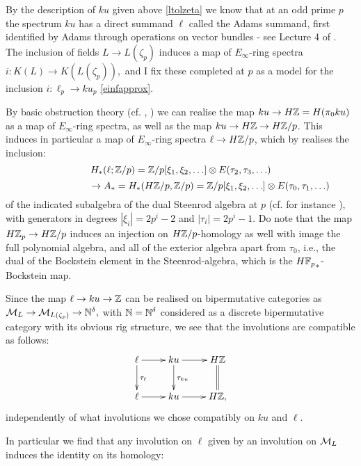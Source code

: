 By the description of $ku$ given above \ref{ltolzeta} we know that
at an odd prime $p$ the spectrum $ku$ has a direct summand $\ell$ 
called the Adams summand, first identified
by Adams through operations on vector bundles - see Lecture 4 of \cite{Ad69}. 
The inclusion of fields
$L\rightarrow L(\zeta_p)$ induces a map of $E_\infty$-ring spectra
$i\colon K(L)\rightarrow K(L(\zeta_p)),$ and I fix these completed at
$p$ as a model for the inclusion $i\colon \ell_p\rightarrow ku_p$ \ref{einfapprox}.

By basic obstruction theory (cf. \cite[Proposition 3.1]{EKMM},
\cite[p. 36, Lemma 2.12]{MayEinf})
we can realise the map $ku\rightarrow H\mathbb{Z} = H(\pi_0ku)$ 
as a map of $E_\infty$-ring spectra, as well as the map 
$ku\rightarrow H\mathbb{Z}\rightarrow H\mathbb{Z}/p$. This induces in particular
a map of $E_\infty$-ring spectra $\ell\rightarrow H\mathbb{Z}/p$, which by
\cite[Lemma 16.8]{Ad74} realises the inclusion:
\[H_*(\ell;\mathbb{Z}/p)=\mathbb{Z}/p[\xi_1,\xi_2,\ldots]\otimes E(\tau_2,\tau_3,\ldots)\]
\[\phantom{blubbelblubbel}\rightarrow A_*=H_*(H\mathbb{Z}/p,\mathbb{Z}/p) = 
\mathbb{Z}/p[\xi_1,\xi_2,\ldots]\otimes E(\tau_0,\tau_1,\ldots)\]
of the indicated subalgebra of the dual Steenrod algebra at $p$
(cf. for instance \cite[pp. 51-53]{Kochm}), with generators in degrees
$|\xi_i|=2p^i-2$ and $|\tau_i|=2p^i-1$. Do note that the map $H\mathbb{Z}_p\rightarrow
H\mathbb{Z}/p$ induces an injection on $H\mathbb{Z}/p$-homology as well 
with image the full polynomial algebra, and all of the
exterior algebra apart from $\tau_0$, i.e., the dual of the Bockstein
element in the Steenrod-algebra, which is the ${H\mathbb{F}_p}_*$-Bockstein
map.

Since the map $\ell\rightarrow ku\rightarrow \mathbb{Z}$ can be realised on
bipermutative categories as $\mathcal{M}_L\rightarrow \mathcal{M}_{L(\zeta_p)}\rightarrow 
\mathbb{N}^\delta,$ with $\mathbb{N}=\mathbb{N}^\delta$ considered as a discrete bipermutative 
category with its obvious rig structure, we see that the involutions
are compatible as follows:
\[\xymatrix{\ell\ar[d]^{\tau_\ell} \ar[r] & ku\ar[d]^{\tau_{ku}}\ar[r] 
		& H\Z\ar@{=}[d]\\\ell\ar[r]&ku\ar[r]&H\Z,}\]
independently of what involutions we chose compatibly on $ku$ and $\ell$.

In particular we find that any involution on $\ell$ given by an involution
on $\mathcal{M}_L$ induces the identity on its homology:
{}


